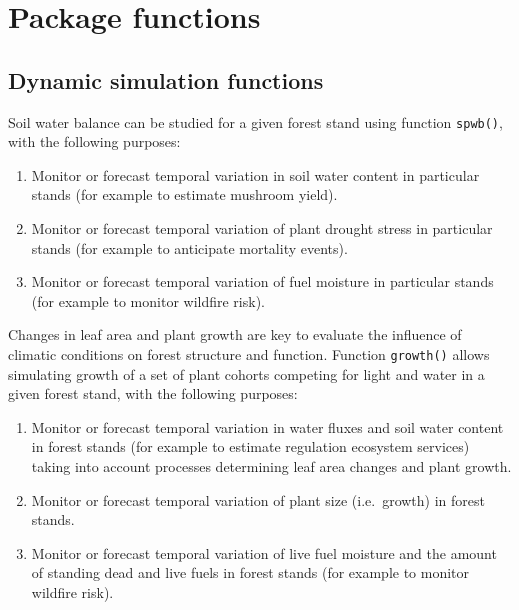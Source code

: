\documentclass[]{book}
\providecommand{\tightlist}{%
  \setlength{\itemsep}{0pt}\setlength{\parskip}{0pt}}
\begin{document}
\hypertarget{package-functions}{%
\section{Package functions}\label{package-functions}}

\hypertarget{dynamic-simulation-functions}{%
\subsection{Dynamic simulation functions}\label{dynamic-simulation-functions}}

Soil water balance can be studied for a given forest stand using function \texttt{spwb()}, with the following purposes:

\begin{enumerate}
\def\labelenumi{\arabic{enumi}.}
\tightlist
\item
  Monitor or forecast temporal variation in soil water content in particular stands (for example to estimate mushroom yield).
\item
  Monitor or forecast temporal variation of plant drought stress in particular stands (for example to anticipate mortality events).
\item
  Monitor or forecast temporal variation of fuel moisture in particular stands (for example to monitor wildfire risk).
\end{enumerate}

Changes in leaf area and plant growth are key to evaluate the influence of climatic conditions on forest structure and function. Function \texttt{growth()} allows simulating growth of a set of plant cohorts competing for light and water in a given forest stand, with the following purposes:

\begin{enumerate}
\def\labelenumi{\arabic{enumi}.}
\tightlist
\item
  Monitor or forecast temporal variation in water fluxes and soil water content in forest stands (for example to estimate regulation ecosystem services) taking into account processes determining leaf area changes and plant growth.
\item
  Monitor or forecast temporal variation of plant size (i.e.~growth) in forest stands.
\item
  Monitor or forecast temporal variation of live fuel moisture and the amount of standing dead and live fuels in forest stands (for example to monitor wildfire risk).
\end{enumerate}
\end{document}
